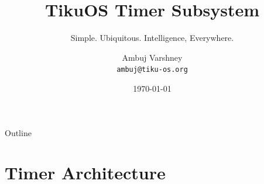 \documentclass[aspectratio=169, 10pt]{beamer}
\title[TikuOS Timers]{TikuOS Timer Subsystem}
\subtitle{Simple. Ubiquitous. Intelligence, Everywhere.}
\author[Ambuj Varshney]{Ambuj Varshney \\ \texttt{ambuj@tiku-os.org}}
\date{\today}
\begin{document}
\begin{frame}
\titlepage
\end{frame}

\begin{frame}{Outline}
\tableofcontents
\end{frame}

\section{Timer Architecture}
\end{document}
